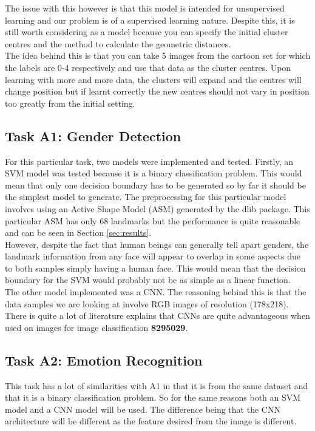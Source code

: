 \documentclass{article}
\begin{document}
	 The issue with this however is that this model is intended for unsupervised learning and our problem is of a supervised learning nature. Despite this, it is still worth considering as a model because you can specify the initial cluster centres and the method to calculate the geometric distances.\\
	 
	  The idea behind this is that you can take 5 images from the cartoon set for which the labels are 0-4 respectively and use that data as the cluster centres. Upon learning with more and more data, the clusters will expand and the centres will change position but if learnt correctly the new centres should not vary in position too greatly from the initial setting.
	  
    \subsection{Task A1: Gender Detection}
    For this particular task, two models were implemented and tested. Firstly, an SVM model was tested because it is a binary classification problem. This would mean that only one decision boundary has to be generated so by far it should be the simplest model to generate. The preprocessing for this particular model involves using an Active Shape Model (ASM) generated by the dlib package. This particular ASM has only 68 landmarks but the performance is quite reasonable and can be seen in Section \ref{sec:results}. \\
    
    However, despite the fact that human beings can generally tell apart genders, the landmark information from any face will appear to overlap in some aspects due to both samples simply having a human face. This would mean that the decision boundary for the SVM would probably not be as simple as a linear function. \\
    
    The other model implemented was a CNN. The reasoning behind this is that the data samples we are looking at involve RGB images of resolution (178x218). There is quite a lot of literature explains that CNNs are quite advantageous when used on images for image classification \textbf{8295029}. 
    \subsection{Task A2: Emotion Recognition}
    This task has a lot of similarities with A1 in that it is from the same dataset and that it is a binary classification problem. So for the same reasons both an SVM model and a CNN model will be used. The difference being that the CNN architecture will be different as the feature desired from the image is different.
\end{document}

